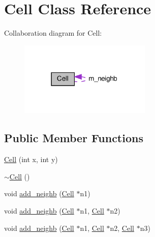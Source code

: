 \hypertarget{class_cell}{}\section{Cell Class Reference}
\label{class_cell}


Collaboration diagram for Cell\+:\nopagebreak
\begin{figure}[H]
\begin{center}
\leavevmode
\includegraphics[width=178pt]{class_cell__coll__graph}
\end{center}
\end{figure}
\subsection*{Public Member Functions}
\begin{DoxyCompactItemize}
\item 
\hyperlink{class_cell_aa39ad04eeebb7bf00d592ad36640337e}{Cell} (int x, int y)
\item 
\hyperlink{class_cell_a9fa559f7a28e2b4336c6879ca09304d8}{$\sim$\+Cell} ()
\item 
void \hyperlink{class_cell_af74ee3d2e1d987c54f00f0edace4f5ab}{add\+\_\+neighb} (\hyperlink{class_cell}{Cell} $\ast$n1)
\item 
void \hyperlink{class_cell_a81f2432f9fbe040ba4f778726f72f50c}{add\+\_\+neighb} (\hyperlink{class_cell}{Cell} $\ast$n1, \hyperlink{class_cell}{Cell} $\ast$n2)
\item 
void \hyperlink{class_cell_a60802074b978ca9e07e0b66c6470fccd}{add\+\_\+neighb} (\hyperlink{class_cell}{Cell} $\ast$n1, \hyperlink{class_cell}{Cell} $\ast$n2, \hyperlink{class_cell}{Cell} $\ast$n3)
\end{DoxyCompactItemize}
